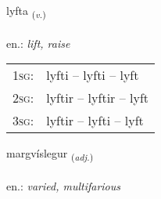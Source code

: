 \documentclass[frontgrid, backgrid]{flacards}\usepackage[]{graphicx}\usepackage[]{xcolor}
\begin{document}
\renewcommand{\flhead}{\vskip5pt \fboxsep=0pt {\small\bfseries\footnotesize Sagnorð | Verb}}
\renewcommand{\fcfoot}{\vskip5pt \fboxsep=0pt \hspace{2pt}{\small\bfseries\footnotesize 2K}}

\renewcommand{\blhead}{\vskip5pt {\small\bfseries\footnotesize Sagnorð | Verb }}
\renewcommand{\bcfoot}{\vskip5pt \hspace{2pt}{\small\bfseries\footnotesize 2K}}


{lyfta \small{\textsubscript{(\textit{v.})}} \\[1ex] %
\textphonetic{[lɪfta]} \\
en.: \emph{lift, raise} \\  [2ex]
\renewcommand*{\arraystretch}{0.8}
\begin{tabular}{p{1cm}l}
\textsc{1sg}: & lyfti -- lyfti -- lyft \\ 
\textsc{2sg}: & lyftir -- lyftir -- lyft \\ 
\textsc{3sg}: & lyftir -- lyfti -- lyft \\ 
\end{tabular}
}

\renewcommand{\flhead}{\vskip5pt \fboxsep=0pt {\small\bfseries\footnotesize Lýsingarorð | Adjective}}
\renewcommand{\fcfoot}{\vskip5pt \fboxsep=0pt \hspace{2pt}{\small\bfseries\footnotesize 2K}}

\renewcommand{\blhead}{\vskip5pt {\small\bfseries\footnotesize Lýsingarorð | Adjective }}
\renewcommand{\bcfoot}{\vskip5pt \hspace{2pt}{\small\bfseries\footnotesize 2K}}


{margvíslegur \small{\textsubscript{(\textit{adj.})}} \\[1ex] %
\textphonetic{[markvistlɛɣʏr]} \\
en.: \emph{varied, multifarious} \\  [2ex]
\renewcommand*{\arraystretch}{0.8}
}
\end{document}
